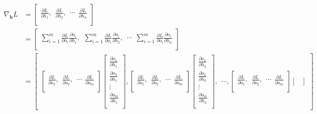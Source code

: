 \documentclass[12pt]{article}
\numberwithin{equation}{section}
\begin{document}
\begin{equation}\begin{split}
\nabla_{\mathbf{h}} L &= 
\begin{bmatrix}
\frac{\partial L}{\partial h_1},
\ \ \frac{\partial L}{\partial h_2},
\ \ \cdots
\ \ \frac{\partial L}{\partial h_n}\\
\end{bmatrix} \\&= 
\begin{bmatrix}
\sum_{i=1}^{m} \frac{\partial L}{\partial o_i}\frac{\partial o_i}{\partial h_1},
\ \ \sum_{i=1}^{m}  \frac{\partial L}{\partial o_i}\frac{\partial o_i}{\partial h_2},
\ \ \cdots
\ \ \sum_{i=1}^{m}  \frac{\partial L}{\partial o_i}\frac{\partial o_i}{\partial h_n}\\
\end{bmatrix} \\&=
\begin{bmatrix}
	\begin{bmatrix}
	\frac{\partial L}{\partial o_1},
	\ \ \frac{\partial L}{\partial o_2},
	\ \ \cdots
	\ \ \frac{\partial L}{\partial o_m}\\
	\end{bmatrix}
	\begin{bmatrix}
	\frac{\partial o_1}{\partial h_1}\\
	\frac{\partial o_2}{\partial h_1}\\
	\vdots\\
	\frac{\partial o_m}{\partial h_1}\\
	\end{bmatrix},
	\begin{bmatrix}
	\frac{\partial L}{\partial o_1},
	\ \ \frac{\partial L}{\partial o_2},
	\ \ \cdots
	\ \ \frac{\partial L}{\partial o_m}\\
	\end{bmatrix}
	\begin{bmatrix}
	\frac{\partial o_1}{\partial h_2}\\
	\frac{\partial o_2}{\partial h_2}\\
	\vdots\\
	\frac{\partial o_m}{\partial h_2}\\
	\end{bmatrix},
\ \ \cdots,
	\begin{bmatrix}
	\frac{\partial L}{\partial o_1},
	\ \ \frac{\partial L}{\partial o_2},
	\ \ \cdots
	\ \ \frac{\partial L}{\partial o_m}\\
	\end{bmatrix}
	\begin{bmatrix}

\end{bmatrix}
\end{bmatrix}
\end{split}
\end{equation}
\end{document}
